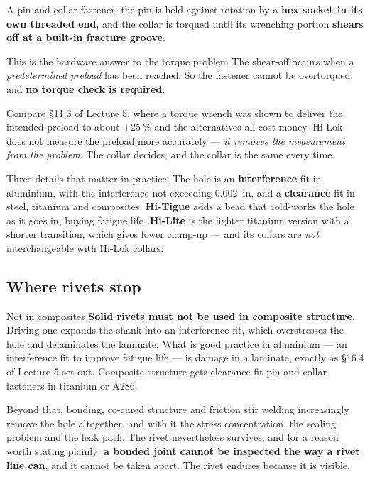 \documentclass[11pt,a4paper]{article}
\begin{document}
A pin-and-collar fastener: the pin is held against rotation by a \textbf{hex socket in its own
threaded end}, and the collar is torqued until its wrenching portion \textbf{shears off at a built-in
fracture groove}.

\begin{keybox}{This is the hardware answer to the torque problem}
The shear-off occurs when a \emph{predetermined preload} has been reached. So the fastener cannot
be overtorqued, and \textbf{no torque check is required}.

\medskip
Compare \S11.3 of Lecture 5, where a torque wrench was shown to deliver the intended preload to
about $\pm\SI{25}{\percent}$ and the alternatives all cost money. Hi-Lok does not measure the
preload more accurately --- \emph{it removes the measurement from the problem}. The collar decides,
and the collar is the same every time.
\end{keybox}

\medskip
Three details that matter in practice. The hole is an \textbf{interference} fit in aluminium, with
the interference not exceeding \SI{0.002}{in}, and a \textbf{clearance} fit in steel, titanium and
composites. \textbf{Hi-Tigue} adds a bead that cold-works the hole as it goes in, buying fatigue
life. \textbf{Hi-Lite} is the lighter titanium version with a shorter transition, which gives lower
clamp-up --- and its collars are \emph{not} interchangeable with Hi-Lok collars.

\subsection{Where rivets stop}

\begin{aerobox}{Not in composites}
\textbf{Solid rivets must not be used in composite structure.} Driving one expands the shank into an
interference fit, which overstresses the hole and delaminates the laminate. What is good practice in
aluminium --- an interference fit to improve fatigue life --- is damage in a laminate, exactly as
\S16.4 of Lecture 5 set out. Composite structure gets clearance-fit pin-and-collar fasteners in
titanium or A286.
\end{aerobox}

\medskip
Beyond that, bonding, co-cured structure and friction stir welding increasingly remove the hole
altogether, and with it the stress concentration, the sealing problem and the leak path. The rivet
nevertheless survives, and for a reason worth stating plainly: \textbf{a bonded joint cannot be
inspected the way a rivet line can}, and it cannot be taken apart. The rivet endures because it is
visible.
\end{document}
